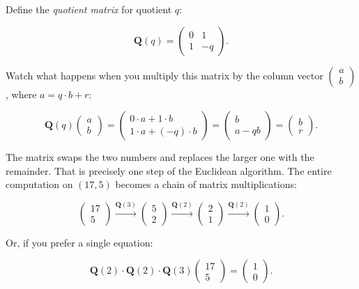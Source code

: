 Define the \textit{quotient matrix} for quotient $q$:

\[
\mathbf{Q}(q) = \begin{pmatrix} 0 & 1 \\ 1 & -q \end{pmatrix}.\]

Watch what happens when you multiply this matrix by the column vector $\begin{pmatrix} a \\ b \end{pmatrix}$, where $a = q \cdot b + r$:

\[
\mathbf{Q}(q) \begin{pmatrix} a \\ b \end{pmatrix} = \begin{pmatrix} 0 \cdot a + 1 \cdot b \\ 1 \cdot a + (-q) \cdot b \end{pmatrix} = \begin{pmatrix} b \\ a - qb \end{pmatrix} = \begin{pmatrix} b \\ r \end{pmatrix}.\]

The matrix swaps the two numbers and replaces the larger one with the remainder. That is precisely one step of the Euclidean algorithm. The entire computation on $(17, 5)$ becomes a chain of matrix multiplications:

\[
\begin{pmatrix} 17 \\ 5 \end{pmatrix} \xrightarrow{\mathbf{Q}(3)} \begin{pmatrix} 5 \\ 2 \end{pmatrix} \xrightarrow{\mathbf{Q}(2)} \begin{pmatrix} 2 \\ 1 \end{pmatrix} \xrightarrow{\mathbf{Q}(2)} \begin{pmatrix} 1 \\ 0 \end{pmatrix}.\]

Or, if you prefer a single equation:

\[
\mathbf{Q}(2) \cdot \mathbf{Q}(2) \cdot \mathbf{Q}(3) \begin{pmatrix} 17 \\ 5 \end{pmatrix} = \begin{pmatrix} 1 \\ 0 \end{pmatrix}.\]


